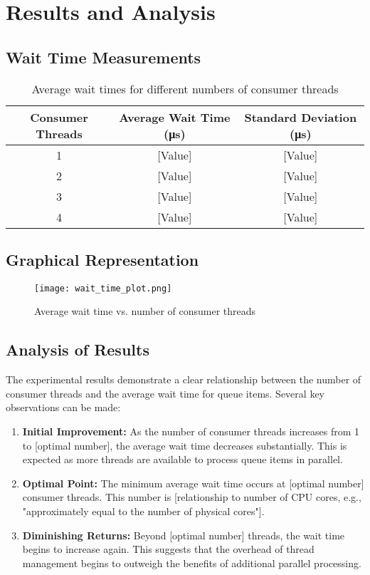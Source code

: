 \documentclass[12pt,a4paper]{article}
\begin{document}
\section{Results and Analysis}

\subsection{Wait Time Measurements}

\begin{table}[h]
\centering
\begin{tabular}{ccc}
\toprule
\textbf{Consumer Threads} & \textbf{Average Wait Time (μs)} & \textbf{Standard Deviation (μs)} \\
\midrule
1 & [Value] & [Value] \\
2 & [Value] & [Value] \\
3 & [Value] & [Value] \\
4 & [Value] & [Value] \\
\bottomrule
\end{tabular}
\caption{Average wait times for different numbers of consumer threads}
\label{tab:wait_times}
\end{table}

\subsection{Graphical Representation}

\begin{figure}[h]
\centering
\texttt{[image: wait\_time\_plot.png]}
\caption{Average wait time vs. number of consumer threads}
\label{fig:wait_time_plot}
\end{figure}

\subsection{Analysis of Results}

The experimental results demonstrate a clear relationship between the number of consumer threads and the average wait time for queue items. Several key observations can be made:

\begin{enumerate}
  \item \textbf{Initial Improvement:} As the number of consumer threads increases from 1 to [optimal number], the average wait time decreases substantially. This is expected as more threads are available to process queue items in parallel.
  
  \item \textbf{Optimal Point:} The minimum average wait time occurs at [optimal number] consumer threads. This number is [relationship to number of CPU cores, e.g., "approximately equal to the number of physical cores"].
  
  \item \textbf{Diminishing Returns:} Beyond [optimal number] threads, the wait time begins to increase again. This suggests that the overhead of thread management begins to outweigh the benefits of additional parallel processing.
\end{enumerate}
\end{document}
